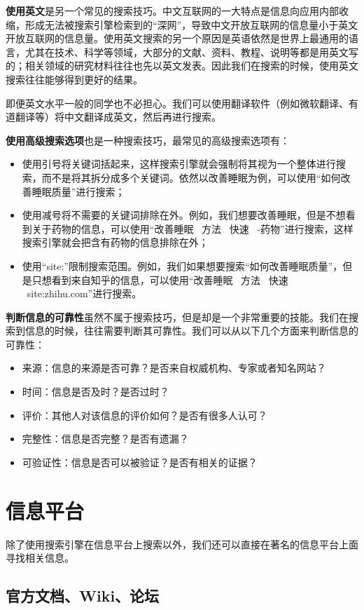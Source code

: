 \documentclass[../main.tex]{subfiles}
\begin{document}
\textbf{使用英文}是另一个常见的搜索技巧。中文互联网的一大特点是信息向应用内部收缩，形成无法被搜索引擎检索到的“深网”，导致中文开放互联网的信息量小于英文开放互联网的信息量。使用英文搜索的另一个原因是英语依然是世界上最通用的语言，尤其在技术、科学等领域，大部分的文献、资料、教程、说明等都是用英文写的；相关领域的研究材料往往也先以英文发表。因此我们在搜索的时候，使用英文搜索往往能够得到更好的结果。

即便英文水平一般的同学也不必担心。我们可以使用翻译软件（例如微软翻译、有道翻译等）将中文翻译成英文，然后再进行搜索。

\textbf{使用高级搜索选项}也是一种搜索技巧，最常见的高级搜索选项有：
\begin{itemize}
  \item 使用引号将关键词括起来，这样搜索引擎就会强制将其视为一个整体进行搜索，而不是将其拆分成多个关键词。依然以改善睡眠为例，可以使用“如何改善睡眠质量”进行搜索；
  \item 使用减号将不需要的关键词排除在外。例如，我们想要改善睡眠，但是不想看到关于药物的信息，可以使用“改善睡眠 \ 方法 \ 快速 \ -药物”进行搜索，这样搜索引擎就会把含有药物的信息排除在外；
  \item 使用“site:”限制搜索范围。例如，我们如果想要搜索“如何改善睡眠质量”，但是只想看到来自知乎的信息，可以使用“改善睡眠 \ 方法 \ 快速 \ site:zhihu.com”进行搜索。
\end{itemize}

\textbf{判断信息的可靠性}虽然不属于搜索技巧，但是却是一个非常重要的技能。我们在搜索到信息的时候，往往需要判断其可靠性。我们可以从以下几个方面来判断信息的可靠性：
\begin{itemize}
  \item 来源：信息的来源是否可靠？是否来自权威机构、专家或者知名网站？
  \item 时间：信息是否及时？是否过时？
  \item 评价：其他人对该信息的评价如何？是否有很多人认可？
  \item 完整性：信息是否完整？是否有遗漏？
  \item 可验证性：信息是否可以被验证？是否有相关的证据？
\end{itemize}

\section{信息平台}

除了使用搜索引擎在信息平台上搜索以外，我们还可以直接在著名的信息平台上面寻找相关信息。

\subsection{官方文档、Wiki、论坛}
\end{document}
